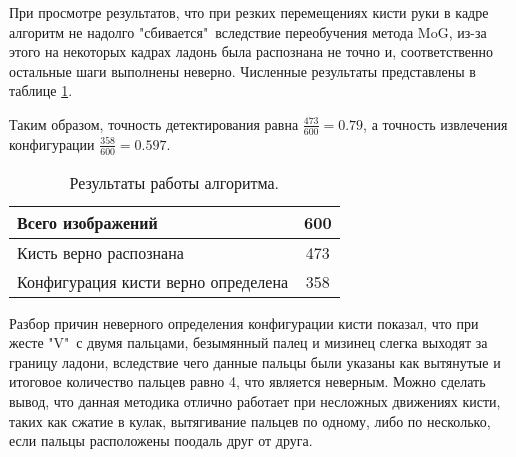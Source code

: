 При просмотре результатов, что
при резких перемещениях кисти руки в кадре алгоритм не надолго "сбивается"\ вследствие 
переобучения метода MoG, из-за этого на некоторых кадрах ладонь была распознана не точно и,
соответственно остальные шаги выполнены неверно. Численные результаты
представлены в таблице \ref{results-table}. 

Таким образом, точность детектирования
равна $\frac{473}{600} = 0.79$, а точность извлечения конфигурации 
$\frac{358}{600} = 0.597$.

\begin{table}[h]
\begin{center}
\begin{tabular}{|l|c|}\hline
Всего изображений & 600 \\ \hline
Кисть верно распознана & 473 \\ \hline
Конфигурация кисти верно определена & 358 \\ \hline
\end{tabular}
\end{center}
\caption{\label{results-table} Результаты работы алгоритма.}
\end{table}

Разбор причин неверного определения конфигурации кисти показал, что при жесте "V"\ с двумя 
пальцами, безымянный палец и мизинец слегка выходят за границу ладони, вследствие чего данные
пальцы были указаны как вытянутые и итоговое количество пальцев равно 4, что является неверным.
Можно сделать вывод, что данная методика отлично работает при несложных движениях кисти, таких
как сжатие в кулак, вытягивание пальцев по одному, либо по несколько, если пальцы
расположены поодаль друг от друга. 



